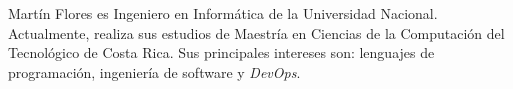\documentclass[journal]{IEEEtran}
\begin{document}
\begin{IEEEbiography}{Martín Flores}
es Ingeniero en Informática de la Universidad Nacional. Actualmente, realiza sus estudios de Maestría en Ciencias de la Computación del Tecnológico de Costa Rica. Sus principales intereses son: lenguajes de programación, ingeniería de software y \emph{DevOps}.
\end{IEEEbiography}







\end{document}
